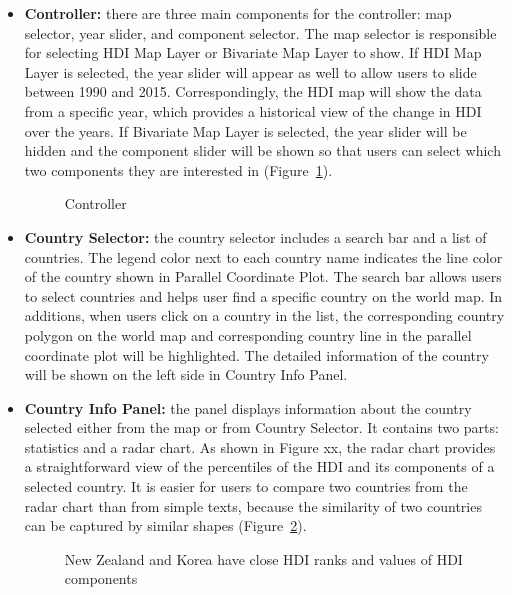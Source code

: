 \begin{itemize}
	\item \textbf{Controller:} there are three main components for the controller: map selector, year slider, and component selector. The map selector is responsible for selecting HDI Map Layer or Bivariate Map Layer to show. If HDI Map Layer is selected, the year slider will appear as well to allow users to slide between 1990 and 2015. Correspondingly, the HDI map will show the data from a specific year, which provides a historical view of the change in HDI over the years. If Bivariate Map Layer is selected, the year slider will be hidden and the component slider will be shown so that users can select which two components they are interested in (Figure~\ref{fig:controller}).
	\begin{figure}[t]
		\centering
        \qquad
		\caption{Controller}
		\label{fig:controller}
	\end{figure}
    \item \textbf{Country Selector:} the country selector includes a search bar and a list of countries. The legend color next to each country name indicates the line color of the country shown in Parallel Coordinate Plot. The search bar allows users to select countries and helps user find a specific country on the world map. In additions, when users click on a country in the list, the corresponding country polygon on the world map and corresponding country line in the parallel coordinate plot will be highlighted. The detailed information of the country will be shown on the left side in Country Info Panel.
    \item \textbf{Country Info Panel:} the panel displays information about the country selected either from the map or from Country Selector. It contains two parts: statistics and a radar chart.  As shown in Figure xx, the radar chart provides a straightforward view of the percentiles of the HDI and its components of a selected country. It is easier for users to compare two countries from the radar chart than from simple texts, because the similarity of two countries can be captured by similar shapes (Figure~\ref{fig:panel}).
    \begin{figure}[t]
    	\centering
        \qquad
    	\caption{New Zealand and Korea have close HDI ranks and values of HDI components}
    	\label{fig:panel}
    \end{figure}
\end{itemize}

